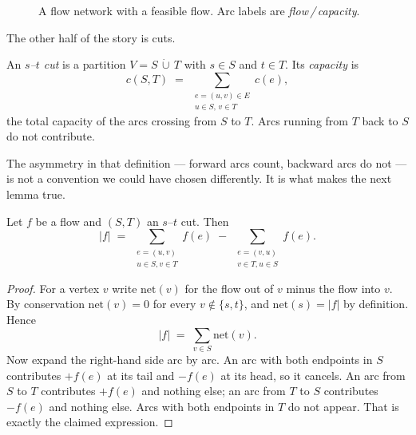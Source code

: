 \begin{figure}[ht]
\centering
{}
\caption{A flow network with a feasible flow. Arc labels are
\emph{flow\,/\,capacity}.}
\label{fig:flow-network}
\end{figure}

The other half of the story is cuts.

\begin{definition}[$s$--$t$ cut]
An \emph{$s$--$t$ cut} is a partition $V = S \,\dot\cup\, T$ with $s \in S$ and
$t \in T$. Its \emph{capacity} is
\[ c(S,T) \;=\; \sum_{\substack{e = (u,v) \in E \\ u \in S,\, v \in T}} c(e), \]
the total capacity of the arcs crossing from $S$ to $T$. Arcs running from $T$
back to $S$ do not contribute.
\end{definition}

The asymmetry in that definition --- forward arcs count, backward arcs do not
--- is not a convention we could have chosen differently. It is what makes the
next lemma true.

\begin{lemma}\label{lem:flow-across-cut}
Let $f$ be a flow and $(S,T)$ an $s$--$t$ cut. Then
\[ |f| \;=\; \sum_{\substack{e=(u,v)\\ u \in S, v \in T}} f(e)
        \;-\; \sum_{\substack{e=(v,u)\\ v \in T, u \in S}} f(e). \]
\end{lemma}

\begin{proof}
For a vertex $v$ write $\mathrm{net}(v)$ for the flow out of $v$ minus the flow
into $v$. By conservation $\mathrm{net}(v) = 0$ for every
$v \notin \{s,t\}$, and $\mathrm{net}(s) = |f|$ by definition. Hence
\[ |f| \;=\; \sum_{v \in S} \mathrm{net}(v). \]
Now expand the right-hand side arc by arc. An arc with both endpoints in $S$
contributes $+f(e)$ at its tail and $-f(e)$ at its head, so it cancels. An arc
from $S$ to $T$ contributes $+f(e)$ and nothing else; an arc from $T$ to $S$
contributes $-f(e)$ and nothing else. Arcs with both endpoints in $T$ do not
appear. That is exactly the claimed expression.
\end{proof}

